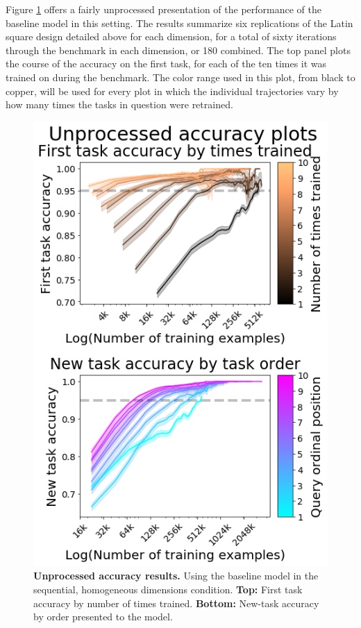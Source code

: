 Figure \ref{fig:results-baseline-sequential-unprocessed-accuracy} offers a fairly unprocessed presentation of the performance of the baseline model in this setting. The results summarize six replications of the Latin square design detailed above for each dimension, for a total of sixty iterations through the benchmark in each dimension, or 180 combined. The top panel plots the course of the accuracy on the first task, for each of the ten times it was trained on during the benchmark. The color range used in this plot, from black to copper, will be used for every plot in which the individual trajectories vary by how many times the tasks in question were retrained. 
\begin{figure}
\vspace{-.3in}
\begin{spacing}{1.0}
\centering
\includegraphics[width=0.95\linewidth]{ch-results/figures/baseline_sequential/unprocessed_accuracy.png}
\caption{ {\bf Unprocessed accuracy results.} Using the baseline model in the sequential, homogeneous dimensions condition. \textbf{Top:} First task accuracy by number of times trained. \textbf{Bottom:} New-task accuracy by order presented to the model. }
\label{fig:results-baseline-sequential-unprocessed-accuracy}
\end{spacing}
\end{figure}
